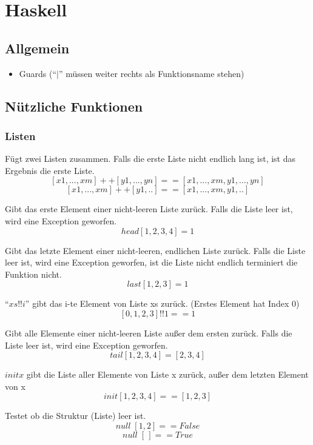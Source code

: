 \lstset{language=Haskell}
\chapter{Haskell}
\section{Allgemein}
\begin{itemize}
	\item Guards (\enquote{$|$} müssen weiter rechts als Funktionsname stehen)
\end{itemize}
\section{Nützliche Funktionen}
\subsection{Listen}
\funcSignature{(++) :: [a] \rightarrow [a] \rightarrow [a]}
Fügt zwei Listen zusammen. Falls die erste Liste nicht endlich lang ist, ist das Ergebnis die erste Liste.
\example
$$[x1, ..., xm] ++ [y1, ..., yn] == [x1, ..., xm, y1, ..., yn]$$
$$[x1, ..., xm] ++ [y1, ..] == [x1, ..., xm, y1, ..]$$

Gibt das erste Element einer nicht-leeren Liste zurück. Falls die Liste leer ist, wird eine Exception geworfen.
\example
$$ head [1,2,3,4] = 1$$

Gibt das letzte Element einer nicht-leeren, endlichen Liste zurück. Falls die Liste leer ist, wird eine Exception geworfen, ist die Liste nicht endlich terminiert die Funktion nicht.
\example
$$last [1,2,3] = 1$$

\enquote{$xs!!i$} gibt das i-te Element von Liste xs zurück. (Erstes Element hat Index 0)
\example
$$[0,1,2,3]!!1 == 1$$

Gibt alle Elemente einer nicht-leeren Liste außer dem ersten zurück. Falls die Liste leer ist, wird eine Exception geworfen.
\example
$$tail [1,2,3,4] = [2,3,4]$$

$init x$ gibt die Liste aller Elemente von Liste x zurück, außer dem letzten Element von x
\example
$$init [1,2,3,4] == [1,2,3]$$

Testet ob die Struktur (Liste) leer ist.
\example
$$null\; [1,2] == False$$
$$null\; [\,] == True$$

